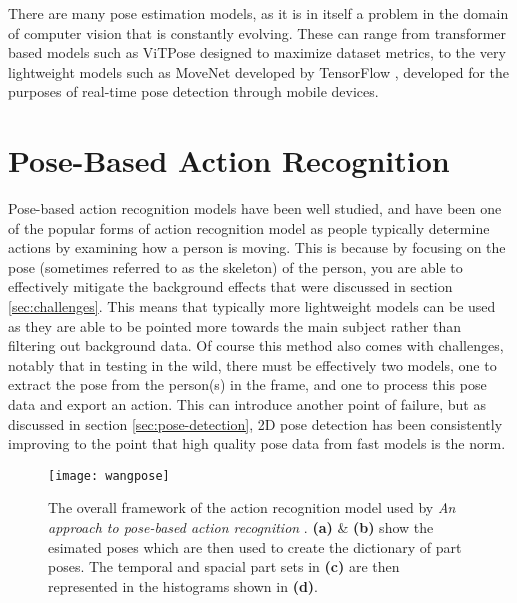 There are many pose estimation models, as it is in itself a problem in the domain of computer vision that is constantly evolving. These can range from transformer based models such as ViTPose \cite{vitpose} designed to maximize dataset metrics, to the very lightweight models such as MoveNet developed by TensorFlow \cite{tensorflow2015-whitepaper}, developed for the purposes of real-time pose detection through mobile devices.

\section{Pose-Based Action Recognition}
\label{sec:pose-based}

Pose-based action recognition models have been well studied, and have been one of the popular forms of action recognition model as people typically determine actions by examining how a person is moving. This is because by focusing on the pose (sometimes referred to as the skeleton) of the person, you are able to effectively mitigate the background effects that were discussed in section \ref{sec:challenges}. This means that typically more lightweight models can be used as they are able to be pointed more towards the main subject rather than filtering out background data. Of course this method also comes with challenges, notably that in testing in the wild, there must be effectively two models, one to extract the pose from the person(s) in the frame, and one to process this pose data and export an action. This can introduce another point of failure, but as discussed in section \ref{sec:pose-detection}, 2D pose detection has been consistently improving to the point that high quality pose data from fast models is the norm.

\begin{figure}[ht]
	\texttt{[image: wangpose]}
	\centering
	\caption{The overall framework of the action recognition model used by \textit{An approach to pose-based action recognition} \cite{WangPose}. \textbf{(a)} \& \textbf{(b)} show the esimated poses which are then used to create the dictionary of part poses. The temporal and spacial part sets in \textbf{(c)} are then represented in the histograms shown in \textbf{(d)}.}
	\label{fig:wangpose}
\end{figure}

